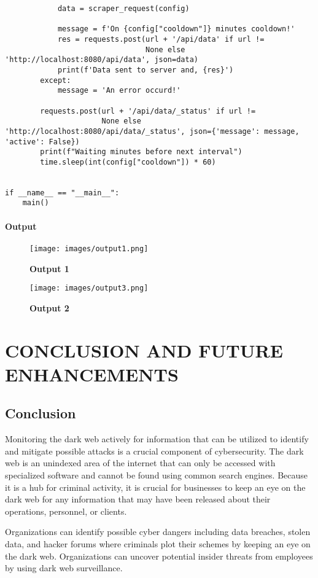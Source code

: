\documentclass[10pt]{report}
\begin{document}
\begin{lstlisting}
            data = scraper_request(config)

            message = f'On {config["cooldown"]} minutes cooldown!'
            res = requests.post(url + '/api/data' if url !=
                                None else 'http://localhost:8080/api/data', json=data)
            print(f'Data sent to server and, {res}')
        except:
            message = 'An error occurd!'

        requests.post(url + '/api/data/_status' if url !=
                      None else 'http://localhost:8080/api/data/_status', json={'message': message, 'active': False})
        print(f"Waiting minutes before next interval")
        time.sleep(int(config["cooldown"]) * 60)


if __name__ == "__main__":
    main()

\end{lstlisting}
\subsubsection{Output}
\begin{figure}[H]
 \centering
 \texttt{[image: images/output1.png]}
 \caption{\textbf{Output 1}}
\end{figure}
\begin{figure}[H]
 \centering
 \texttt{[image: images/output3.png]}
 \caption{\textbf{Output 2}}
\end{figure}
\chapter{CONCLUSION AND FUTURE ENHANCEMENTS}
\linespread{1.5}
\section{Conclusion}
Monitoring the dark web actively for information that can be utilized to identify and mitigate possible attacks is a crucial component of cybersecurity. The dark web is an unindexed area of the internet that can only be accessed with specialized software and cannot be found using common search engines. Because it is a hub for criminal activity, it is crucial for businesses to keep an eye on the dark web for any information that may have been released about their operations, personnel, or clients.

Organizations can identify possible cyber dangers including data breaches, stolen data, and hacker forums where criminals plot their schemes by keeping an eye on the dark web. Organizations can uncover potential insider threats from employees by using dark web surveillance.
\end{document}
